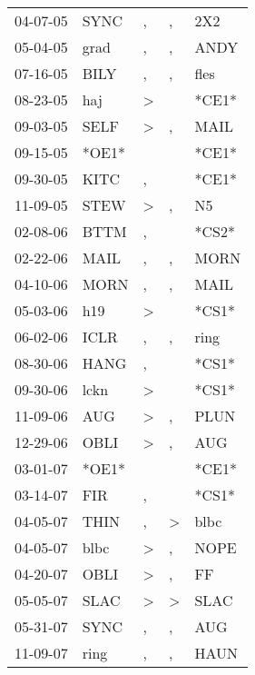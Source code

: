 \begin{supertabular}{lllll}
 04-07-05 &   SYNC &             , &                , &    2X2 \\
 05-04-05 &   grad &             , &                , &   ANDY \\
 07-16-05 &   BILY &             , &                , &   fles \\
 08-23-05 &    haj &  \textgreater &                  &  *CE1* \\
 09-03-05 &   SELF &  \textgreater &                , &   MAIL \\
 09-15-05 &  *OE1* &               &                  &  *CE1* \\
 09-30-05 &   KITC &             , &                  &  *CE1* \\
 11-09-05 &   STEW &  \textgreater &                , &     N5 \\
 02-08-06 &   BTTM &             , &                  &  *CS2* \\
 02-22-06 &   MAIL &             , &                , &   MORN \\
 04-10-06 &   MORN &             , &                , &   MAIL \\
 05-03-06 &    h19 &  \textgreater &                  &  *CS1* \\
 06-02-06 &   ICLR &             , &                , &   ring \\
 08-30-06 &   HANG &             , &                  &  *CS1* \\
 09-30-06 &   lckn &  \textgreater &                  &  *CS1* \\
 11-09-06 &    AUG &  \textgreater &                , &   PLUN \\
 12-29-06 &   OBLI &  \textgreater &                , &    AUG \\
 03-01-07 &  *OE1* &               &                  &  *CE1* \\
 03-14-07 &    FIR &             , &                  &  *CS1* \\
 04-05-07 &   THIN &             , &     \textgreater &   blbc \\
 04-05-07 &   blbc &  \textgreater &                , &   NOPE \\
 04-20-07 &   OBLI &  \textgreater &                , &     FF \\
 05-05-07 &   SLAC &  \textgreater &     \textgreater &   SLAC \\
 05-31-07 &   SYNC &             , &                , &    AUG \\
 11-09-07 &   ring &             , &                , &   HAUN \\

\end{supertabular}
